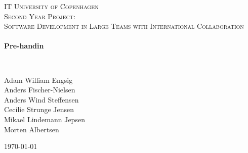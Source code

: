 


%


\begin{center}
\thispagestyle{empty}


\textsc{\LARGE IT University of Copenhagen}\\[1.5cm]

\textsc{\Large Second Year Project: \\ Software Development in Large Teams with International Collaboration}\\[0.5cm]

\HRule \\[0.4cm]
{ \huge \bfseries Pre-handin 
    }

\HRule \\[1cm]


\begin{minipage}{1\textwidth}
\begin{center} \large
Adam William Engsig \\
Anders Fischer-Nielsen \\
Anders Wind Steffensen \\
Cecilie Strunge Jensen \\
Mikael Lindemann Jepsen\\
Morten Albertsen
\end{center}
\end{minipage}


\vfill

{\large \today}

\end{center}

\frontmatter%

%
%


\tableofcontents

\newpage

\mainmatter%






